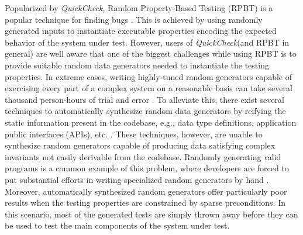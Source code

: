 \documentclass[sigconf, anonymous, review]{acmart}
\newcommand{\quickcheck}{\textit{QuickCheck}\xspace}
\begin{document}
%
Popularized by \quickcheck \cite{ClaessenH00}, Random Property-Based Testing
(RPBT) is a popular technique for finding bugs
\cite{ClaessenH00,hughes2003erlang, papadakis2011proper, bulwahn2012new,
  denes2014quickchick}.
%
This is achieved by using randomly generated inputs to instantiate executable
properties encoding the expected behavior of the system under test.
%
%
%
However, users of \quickcheck (and RPBT in general) are well aware that one of
the biggest challenges while using RPBT is to provide suitable random data
generators needed to instantiate the testing properties.
%
In extreme cases, writing highly-tuned random generators capable of exercising
every part of a complex system on a reasonable basis can take several thousand
person-hours of trial and error \cite{lampropoulos2019coverage}.
%
To alleviate this, there exist several techniques to automatically synthesize
random data generators by reifying the static information present in the
codebase, e.g., data type definitions, application public interfaces (APIs),
etc. \cite{GriecoCB16, DBLP:conf/haskell/MistaRH18, Mista2019GeneratingRS,
  DuregardJW12, Lampropoulos2017, Bendkowski2017}.
%
These techniques, however, are unable to synthesize random generators capable of
producing data satisfying complex invariants not easily derivable from the
codebase.
%
Randomly generating valid programs is a common example of this problem, where
developers are forced to put substantial efforts in writing specialized random
generators by hand \cite{Palka11, perenyi2020stack, yang2011finding}.
%
Moreover, automatically synthesized random generators offer particularly poor
results when the testing properties are constrained by sparse preconditions.
%
In this scenario, most of the generated tests are simply thrown away before they
can be used to test the main components of the system under test.
\end{document}
